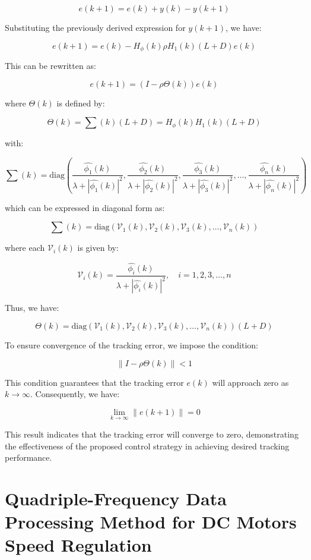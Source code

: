 \documentclass[journal,onecolumn]{IEEEtran}
\begin{document}
\[
e(k+1) = e(k) + y(k) - y(k+1)
\]

Substituting the previously derived expression for \(y(k+1)\), we have:

\[
e(k+1) = e(k) - H_\phi(k) \rho H_1(k) (L + D) e(k)
\]

This can be rewritten as:

\begin{equation}
    \label{model 35}
    e(k+1) = (I - \rho \Theta(k)) e(k)
\end{equation}

where \(\Theta(k)\) is defined by:

\[
\Theta(k) = \sum(k) (L + D) = H_\phi(k) H_1(k) (L + D)
\]

with:

\[
\sum(k) = \text{diag}\left(\frac{\hat{\phi_1}(k)}{\lambda + |\hat{\phi_1}(k)|^2}, \frac{\hat{\phi_2}(k)}{\lambda + |\hat{\phi_2}(k)|^2}, \frac{\hat{\phi_3}(k)}{\lambda + |\hat{\phi_3}(k)|^2}, \dots, \frac{\hat{\phi_n}(k)}{\lambda + |\hat{\phi_n}(k)|^2}\right)
\]

which can be expressed in diagonal form as:

\[
\sum(k) = \text{diag}(\mathcal{V}_1(k), \mathcal{V}_2(k), \mathcal{V}_3(k), \dots, \mathcal{V}_n(k))
\]

where each \(\mathcal{V}_i(k)\) is given by:

\[
\mathcal{V}_i(k) = \frac{\hat{\phi_i}(k)}{\lambda + |\hat{\phi_i}(k)|^2}, \quad i = 1, 2, 3, \dots, n
\]

Thus, we have:

\[
\Theta(k) = \text{diag}(\mathcal{V}_1(k), \mathcal{V}_2(k), \mathcal{V}_3(k), \dots, \mathcal{V}_n(k)) (L + D)
\]

To ensure convergence of the tracking error, we impose the condition:

\begin{equation}
    \label{model 36}
    \|I - \rho \Theta(k)\| < 1
\end{equation}

This condition guarantees that the tracking error \(e(k)\) will approach zero as \(k \to \infty\). Consequently, we have:

\[
\lim_{k \to \infty} \|e(k+1)\| = 0
\]

This result indicates that the tracking error will converge to zero, demonstrating the effectiveness of the proposed control strategy in achieving desired tracking performance.

\section{Quadriple-Frequency Data Processing Method for DC Motors Speed Regulation}
\end{document}
